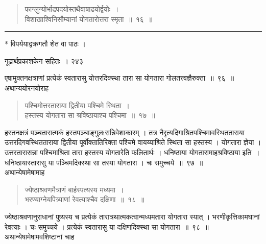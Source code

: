 \documentclass[11pt, openany]{book}
\begin{document}

\begin{quote}
{\ssi फाग्लुन्योर्भाद्रपदयोस्तथैवाषाढयोर्द्वयोः~।\\
 विशाखाश्विनिसौम्यानां योगतारोत्तरा स्मृता~॥~१६~॥}
\end{quote}
\noindent\rule{\linewidth}{.5pt}

\begin{center}
 * विपर्ययाद्वक्रगतौ शेत वा पाठः ।
\end{center}

\newpage

\hspace{3cm} गूढार्थप्रकाशकेन सहितः~। \hfill २४३
\vspace{1cm}


 एषामुक्तनक्षत्राणां प्रत्येकं स्वतारासु योत्तरदिक्स्था तारा सा योगतारा गोलतत्त्वज्ञैरुक्ता~॥~९६~॥\\
 \noindent अथान्ययोरनयोराह \textendash
\begin{quote}
{\ssi पश्चिमोत्तरताराया द्वितीया पश्चिमे स्थिता~।\\ 
हस्तस्य योगतारा सा श्रविष्ठायाश्च पश्चिमा~॥~१७~॥ }
\end{quote}

 हस्तनक्षत्रं पञ्चतारात्मकं हस्तपञ्चाङ्गुलiसन्निवेशाकारम् । तत्र नैरृत्यदिगाश्रितपश्चिमावस्थितताराया उत्तरदिगवस्थितताराया द्वितीया पूर्वोक्तातिरिक्ता पश्चिमे वायय्याश्रिते स्थिता सा हस्तस्य । योगतारा ज्ञेया । उत्तरतारासन्ना पश्चिमाश्रिता तारा हस्तस्य योगतारेति फलितार्थः । धनिष्ठाया योगतारामाह\textendash श्रविष्ठाया इति~। धनिष्ठायास्तारासु या पञ्चिमदिक्स्था सा तस्या योगतारा । चः समुच्चये~॥~९७~॥\\
\noindent अथान्येषामेषामाह \textendash


 \begin{quote}
{\ssi ज्येष्ठाश्रवणमैत्राणं बार्हस्पत्यस्य मध्यमा~।\\
भरण्याग्नेयपित्र्याणां रेवत्याश्चैव दक्षिणा~॥~१८~॥}
\end{quote}
 ज्येष्ठाश्रवणानुराधानां पुष्यस्य च प्रत्येकं तारात्रथात्मकत्वान्मध्यमतारा योगतारा स्यात् । भरणीकृत्तिकामघानां रेवत्याः । चः समुच्चये । प्रत्येकं स्वतारासु या दक्षिणदिक्स्था सा योगतारा~॥~९८~॥\\
\noindent  अथान्येषामेषामवशिष्टानां चाह \textendash
\end{document}
